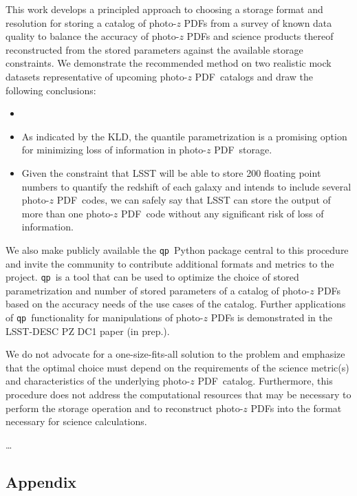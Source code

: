 \documentclass[\docopts]{\docclass}
\newcommand{\qp}{\texttt{qp}}
\newcommand{\pz}{photo-$z$ PDF}
\begin{document}
This work develops a principled approach to choosing a storage format and 
resolution for storing a catalog of \pz s from a survey of known data quality 
to balance the accuracy of \pz s and science products thereof reconstructed 
from the stored parameters against the available storage constraints.  We 
demonstrate the recommended method on two realistic mock datasets 
representative of upcoming \pz\ catalogs and draw the following conclusions:
\begin{itemize}
  \item
  \item As indicated by the KLD, the quantile parametrization is a promising 
option for minimizing loss of information in \pz\ storage.
  \item Given the constraint that LSST will be able to store 200 floating point 
numbers to quantify the redshift of each galaxy and intends to include several 
\pz\ codes, we can safely say that LSST can store the output of more than one 
\pz\ code without any significant risk of loss of information.
\end{itemize}

We also make publicly available the \qp\ Python package central to this 
procedure and invite the community to contribute additional formats and metrics 
to the project.  \qp\ is a tool that can be used to optimize the choice of 
stored parametrization and number of stored parameters of a catalog of \pz s 
based on the accuracy needs of the use cases of the catalog.  Further 
applications of \qp\ functionality for manipulations of \pz s is demonstrated 
in the LSST-DESC PZ DC1 paper (in prep.).

We do not advocate for a one-size-fits-all solution to the problem and 
emphasize that the optimal choice must depend on the requirements of the 
science metric(s) and characteristics of the underlying \pz\ catalog.  
Furthermore, this procedure does not address the computational resources that 
may be necessary to perform the storage operation and to reconstruct \pz s into 
the format necessary for science calculations.

\dots


\subsection*{Appendix}
\label{sec:kld}
\end{document}
